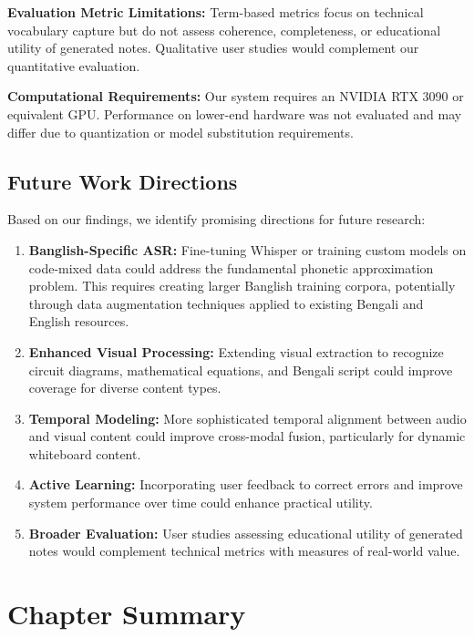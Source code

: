 \textbf{Evaluation Metric Limitations:} Term-based metrics focus on technical vocabulary capture but do not assess coherence, completeness, or educational utility of generated notes. Qualitative user studies would complement our quantitative evaluation.

\textbf{Computational Requirements:} Our system requires an NVIDIA RTX 3090 or equivalent GPU. Performance on lower-end hardware was not evaluated and may differ due to quantization or model substitution requirements.

\subsection{Future Work Directions}

Based on our findings, we identify promising directions for future research:

\begin{enumerate}
    \item \textbf{Banglish-Specific ASR:} Fine-tuning Whisper or training custom models on code-mixed data could address the fundamental phonetic approximation problem. This requires creating larger Banglish training corpora, potentially through data augmentation techniques \cite{Park2019} applied to existing Bengali and English resources.
    
    \item \textbf{Enhanced Visual Processing:} Extending visual extraction to recognize circuit diagrams, mathematical equations, and Bengali script could improve coverage for diverse content types.
    
    \item \textbf{Temporal Modeling:} More sophisticated temporal alignment between audio and visual content could improve cross-modal fusion, particularly for dynamic whiteboard content.
    
    \item \textbf{Active Learning:} Incorporating user feedback to correct errors and improve system performance over time could enhance practical utility.
    
    \item \textbf{Broader Evaluation:} User studies assessing educational utility of generated notes would complement technical metrics with measures of real-world value.
\end{enumerate}

\section{Chapter Summary}

